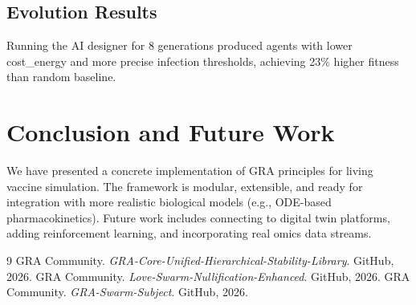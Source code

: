 \documentclass[12pt,a4paper]{article}
\begin{document}
\subsection{Evolution Results}
Running the AI designer for 8 generations produced agents with lower cost\_energy and more precise infection thresholds, achieving 23\% higher fitness than random baseline.

\section{Conclusion and Future Work}
We have presented a concrete implementation of GRA principles for living vaccine simulation. The framework is modular, extensible, and ready for integration with more realistic biological models (e.g., ODE-based pharmacokinetics). Future work includes connecting to digital twin platforms, adding reinforcement learning, and incorporating real omics data streams.


\begin{thebibliography}{9}
 GRA Community. \textit{GRA-Core-Unified-Hierarchical-Stability-Library}. GitHub, 2026.
 GRA Community. \textit{Love-Swarm-Nullification-Enhanced}. GitHub, 2026.
 GRA Community. \textit{GRA-Swarm-Subject}. GitHub, 2026.
\end{thebibliography}
\end{document}
